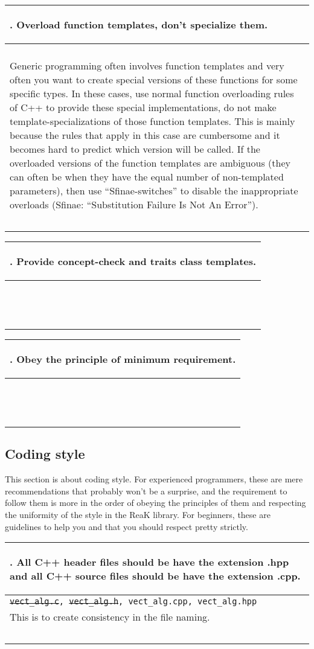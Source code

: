 \documentclass[10pt]{article}
\newcommand{\code}[1]{\color[rgb]{0.2,0.8,0.2}\texttt{#1}\color[rgb]{0,0,0} }
\newcounter {iCommandment}
\newcommand{\CorG}[5]
{
\begin{table}[H]
\begin{center}
\begin{tabular}{| p{12cm} |}
\hline
#1. #2 \\
\hline
\vspace{-0.1cm}
\parbox{12cm}{\code{#3}} \\
\vspace{-0.2cm}
#4 \\
#5 \\
\hline
\end{tabular}
\end{center}
\end{table}
}
\newcommand{\Commandment}[4]
{
\CorG{\textbf{\arabic{iCommandment}}\addtocounter{iCommandment}{1}}
{\textbf{#1}}{#2}{#3}{#4}
}
\begin{document}
\Commandment
{Overload function templates, don't specialize them.}
{\ }
{Generic programming often involves function templates and very often you want to create special versions 
of these functions for some specific types. In these cases, use normal function overloading rules of C++ to 
provide these special implementations, do not make template-specializations of those function templates. This is
mainly because the rules that apply in this case are cumbersome and it becomes hard to predict which version 
will be called. If the overloaded versions of the function templates are ambiguous (they can often be when they 
have the equal number of non-templated parameters), then use ``Sfinae-switches'' to disable the inappropriate 
overloads (Sfinae: ``Substitution Failure Is Not An Error'').}
{\ }

\Commandment
{Provide concept-check and traits class templates.}
{\ }
{\ }
{\ }

\Commandment
{Obey the principle of minimum requirement.}
{\ }
{\ }
{\ }

\subsection{Coding style}

This section is about coding style. For experienced programmers, these are mere recommendations that probably 
won't be a surprise, and the requirement to follow them is more in the order of obeying the principles of them 
and respecting the uniformity of the style in the ReaK library. For beginners, these are guidelines to help you and 
that you should respect pretty strictly.

\Commandment
{All C++ header files should be have the extension .hpp and all C++ source files should be have the extension .cpp.}
{\sout{vect\_alg.c}, \sout{vect\_alg.h}, vect\_alg.cpp, vect\_alg.hpp }
{This is to create consistency in the file naming.}
{\ }
\end{document}
